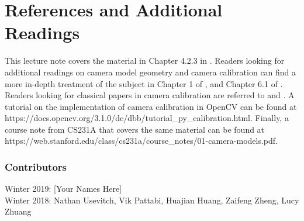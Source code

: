 \documentclass[]{article}
\begin{document}
\section{References and Additional Readings}
This lecture note covers the material in Chapter 4.2.3 in \cite{SNS}. Readers looking for additional readings on camera model geometry and camera calibration can find a more in-depth treatment of the subject in Chapter 1 of \cite{FP}, and Chapter 6.1 of \cite{HZ}. Readers looking for classical papers in camera calibration are referred to \cite{tsai1987versatile} and \cite{zhang2000flexible}. A tutorial on the implementation of camera calibration in OpenCV \cite{opencv_library} can be found at https://docs.opencv.org/3.1.0/dc/dbb/tutorial\_py\_calibration.html. Finally, a course note from CS231A that covers the same material can be found at https://web.stanford.edu/class/cs231a/course\_notes/01-camera-models.pdf.



\subsubsection*{Contributors}
Winter 2019: [Your Names Here]
\\
Winter 2018: Nathan Usevitch, Vik Pattabi, Huajian Huang, Zaifeng Zheng, Lucy Zhuang
\end{document}
